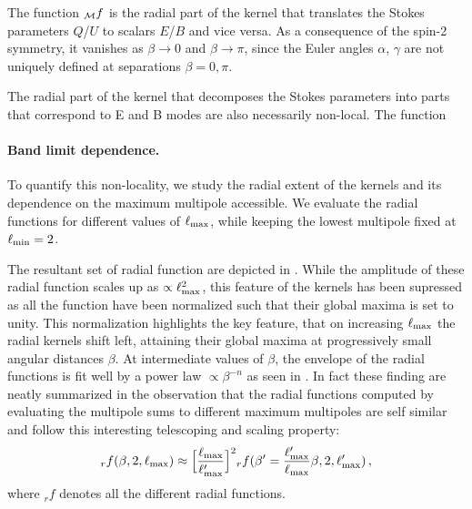 The function ${_{\mathcal{M}}f}$ is the radial part of the kernel that translates the Stokes parameters $Q$/$U$ to scalars $E$/$B$ and vice versa.  As a consequence of the spin-2 symmetry, it vanishes as $\beta \rightarrow 0$ and $\beta \rightarrow \pi$, since the Euler angles $\alpha$, $\gamma$ are not uniquely defined at separations $\beta=0,\pi$.

The radial part of the kernel that decomposes the  Stokes parameters into parts that correspond to E and B modes  are also  necessarily non-local.  The function 

\paragraph{Band limit dependence.} 
To quantify this non-locality, we study the radial extent of the kernels and its dependence on the maximum multipole accessible. We evaluate the radial functions for different values of $\ell_{\rm max}$, while keeping the lowest multipole fixed at $\ell_{\rm min}=2$. 

The resultant set of radial function are depicted in . While the amplitude of these radial function scales up as $\propto \ell_{\rm max}^2$, this feature of the kernels has been supressed as all the function have been normalized such that their global maxima is set to unity.  This normalization highlights the key feature, that on increasing $\ell_{\rm max}$ the radial kernels shift left, attaining their global maxima at progressively small angular distances $\beta$.  At intermediate values of $\beta$, the envelope of the radial functions is fit well by a power law $ \propto \beta^{-n}$ as seen in .
In fact these finding are neatly summarized in the observation that the radial functions computed by evaluating the multipole sums to different maximum multipoles are self similar and follow this interesting telescoping and scaling property: $${}_rf(\beta,2,\ell_{\rm max}) \approx \Big[\frac{\ell_{\rm max}}{\ell'_{\rm max}}\Big]^2{}_rf(\beta'=\frac{\ell'_{\rm max}}{\ell_{\rm max}} \beta ,2,\ell'_{\rm max}) \,,$$ where ${}_rf$ denotes all the different radial functions.
 

